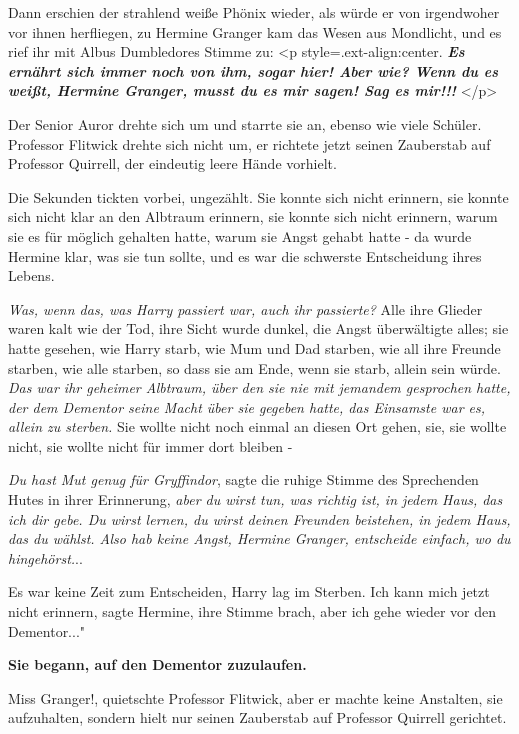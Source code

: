 Dann erschien der strahlend weiße Phönix wieder, als würde er von irgendwoher
vor ihnen herfliegen, zu Hermine Granger kam das Wesen aus Mondlicht, und es
rief ihr mit Albus Dumbledores Stimme zu: <p
style=\grqq{}.ext-align:center\grqq{}. \textbf{\emph{ \glqq Es ernährt sich
immer noch von ihm, sogar hier! Aber wie? Wenn du es weißt, Hermine Granger,
musst du es mir sagen! Sag es mir!!!\grqq{} }}</p>

Der Senior Auror drehte sich um und starrte sie an, ebenso wie viele Schüler.
Professor Flitwick drehte sich nicht um, er richtete jetzt seinen Zauberstab auf
Professor Quirrell, der eindeutig leere Hände vorhielt.

Die Sekunden tickten vorbei, ungezählt. Sie konnte sich nicht erinnern, sie
konnte sich nicht klar an den Albtraum erinnern, sie konnte sich nicht erinnern,
warum sie es für möglich gehalten hatte, warum sie Angst gehabt hatte - da wurde
Hermine klar, was sie tun sollte, und es war die schwerste Entscheidung ihres
Lebens.

\emph{ Was, wenn das, was Harry passiert war, auch ihr passierte?}
Alle ihre Glieder waren kalt wie der Tod, ihre Sicht wurde dunkel, die Angst
überwältigte alles; sie hatte gesehen, wie Harry starb, wie Mum und Dad starben,
wie all ihre Freunde starben, wie alle starben, so dass sie am Ende, wenn sie
starb, allein sein würde.
\emph{Das war ihr geheimer Albtraum, über den sie nie mit jemandem gesprochen hatte, der dem Dementor seine Macht über sie gegeben hatte, das Einsamste war es, allein zu sterben.}
Sie wollte nicht noch einmal an diesen Ort gehen, sie, sie wollte nicht, sie
wollte nicht für immer dort bleiben -

\emph{Du hast Mut genug für Gryffindor}, sagte die ruhige Stimme des Sprechenden
Hutes in ihrer Erinnerung, \emph{aber du wirst tun, was richtig ist, in jedem
Haus, das ich dir gebe. Du wirst lernen, du wirst deinen Freunden beistehen, in
jedem Haus, das du wählst. Also hab keine Angst, Hermine Granger, entscheide
einfach, wo du hingehörst.}..

Es war keine Zeit zum Entscheiden, Harry lag im Sterben. \glqq Ich kann mich
jetzt nicht erinnern\grqq{}, sagte Hermine, ihre Stimme brach, \glqq aber ich
gehe wieder vor den Dementor..."

\textbf{ Sie begann, auf den Dementor zuzulaufen.}

\glqq Miss Granger!\grqq{}, quietschte Professor Flitwick, aber er machte keine
Anstalten, sie aufzuhalten, sondern hielt nur seinen Zauberstab auf Professor
Quirrell gerichtet.

